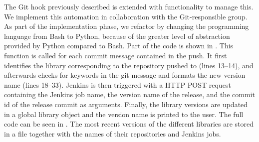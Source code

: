 The Git hook previously described is extended with functionality to manage this. We implement this automation in collaboration with the Git-responsible group. As part of the implementation phase, we refactor by changing the programming language from Bash to Python, because of the greater level of abstraction provided by Python compared to Bash. Part of the code is shown in . This function is called for each commit message contained in the push. It first identifies the library corresponding to the repository pushed to (lines 13--14), and afterwards checks for keywords in the git message and formats the new version name (lines 18--33). Jenkins is then triggered with a HTTP POST request containing the Jenkins job name, the version name of the release, and the commit id of the release commit as arguments. Finally, the library versions are updated in a global library object and the version name is printed to the user. The full code can be seen in . The most recent versions of the different libraries are stored in a file together with the names of their repositories and Jenkins jobs.


